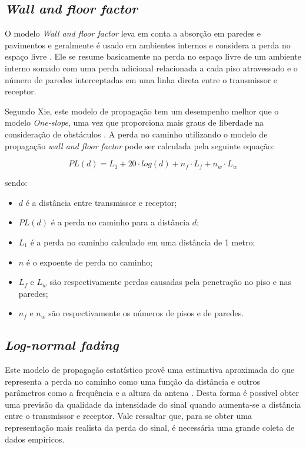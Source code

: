 \documentclass[
	12pt,				%
	twoside,			%
	a4paper,			%
	english,			%
	french,				%
	spanish,			%
	brazil				%
	]{abntex2}
\begin{document}
\subsection{\texorpdfstring{\emph{Wall and floor
factor}}{Wall and floor factor}}\label{sec:wall_floor}

O modelo \emph{Wall and floor factor} leva em conta a absorção em
paredes e pavimentos e geralmente é usado em ambientes internos e
considera a perda no espaço livre \cite{LUO, RAPPAPORT}. Ele se resume
basicamente na perda no espaço livre de um ambiente interno somado com
uma perda adicional relacionada a cada piso atravessado e o número de
paredes interceptadas em uma linha direta entre o transmissor e
receptor.

Segundo Xie, este modelo de propagação tem um desempenho melhor que o
modelo \emph{One-slope}, uma vez que proporciona mais graus de liberdade
na consideração de obstáculos \cite{XIE}. A perda no caminho utilizando
o modelo de propagação \emph{wall and floor factor} pode ser calculada
pela seguinte equação:

\begin{equation}
    PL(d) = L_{1} + 20 \cdot log(d) + n_{f} \cdot L_{f} + n_{w} \cdot L_{w}
\end{equation}

sendo:

\begin{itemize}
\item
  \(d\) é a distância entre transmissor e receptor;
\item
  \(PL(d)\) é a perda no caminho para a distância \(d\);
\item
  \(L_{1}\) é a perda no caminho calculado em uma distância de 1 metro;
\item
  \(n\) é o expoente de perda no caminho;
\item
  \(L_{f}\) e \(L_{w}\) são respectivamente perdas causadas pela
  penetração no piso e nas paredes;
\item
  \(n_{f}\) e \(n_{w}\) são respectivamente os números de pisos e de
  paredes.
\end{itemize}

\subsection{\texorpdfstring{\emph{Log-normal
fading}}{Log-normal fading}}\label{sec:log_normal_fading}

Este modelo de propagação estatístico provê uma estimativa aproximada do
que representa a perda no caminho como uma função da distância e outros
parâmetros como a frequência e a altura da antena \cite{BUDGETS}. Desta
forma é possível obter uma previsão da qualidade da intensidade do sinal
quando aumenta-se a distância entre o transmissor e receptor. Vale
ressaltar que, para se obter uma representação mais realista da perda do
sinal, é necessária uma grande coleta de dados empíricos.
\end{document}
